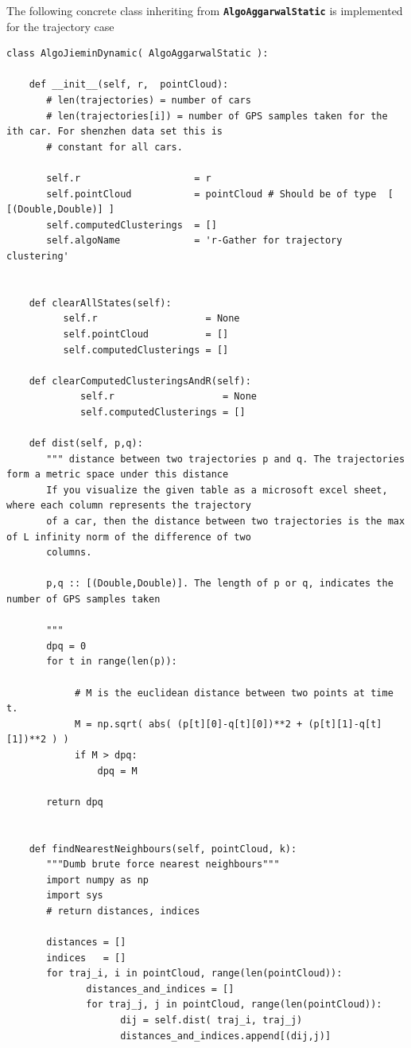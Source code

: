 \documentclass[11pt]{article}
\begin{document}
The following concrete class inheriting from \textbf{\verb~AlgoAggarwalStatic~} is implemented for the trajectory case
\begin{verbatim}
class AlgoJieminDynamic( AlgoAggarwalStatic ):

    def __init__(self, r,  pointCloud):
       # len(trajectories) = number of cars
       # len(trajectories[i]) = number of GPS samples taken for the ith car. For shenzhen data set this is
       # constant for all cars.

       self.r                    = r     
       self.pointCloud           = pointCloud # Should be of type  [ [(Double,Double)] ] 
       self.computedClusterings  = []  
       self.algoName             = 'r-Gather for trajectory clustering'


    def clearAllStates(self):
          self.r                   = None
          self.pointCloud          = [] 
          self.computedClusterings = []

    def clearComputedClusteringsAndR(self):
             self.r                   = None
             self.computedClusterings = []

    def dist(self, p,q):
       """ distance between two trajectories p and q. The trajectories form a metric space under this distance 
       If you visualize the given table as a microsoft excel sheet, where each column represents the trajectory 
       of a car, then the distance between two trajectories is the max of L infinity norm of the difference of two 
       columns. 

       p,q :: [(Double,Double)]. The length of p or q, indicates the number of GPS samples taken

       """
       dpq = 0
       for t in range(len(p)):

            # M is the euclidean distance between two points at time t.  
            M = np.sqrt( abs( (p[t][0]-q[t][0])**2 + (p[t][1]-q[t][1])**2 ) ) 
            if M > dpq:
                dpq = M

       return dpq


    def findNearestNeighbours(self, pointCloud, k):
       """Dumb brute force nearest neighbours"""
       import numpy as np
       import sys
       # return distances, indices

       distances = []
       indices   = []
       for traj_i, i in pointCloud, range(len(pointCloud)):
              distances_and_indices = []
              for traj_j, j in pointCloud, range(len(pointCloud)):
                    dij = self.dist( traj_i, traj_j)
                    distances_and_indices.append[(dij,j)]


\end{verbatim}
\end{document}
